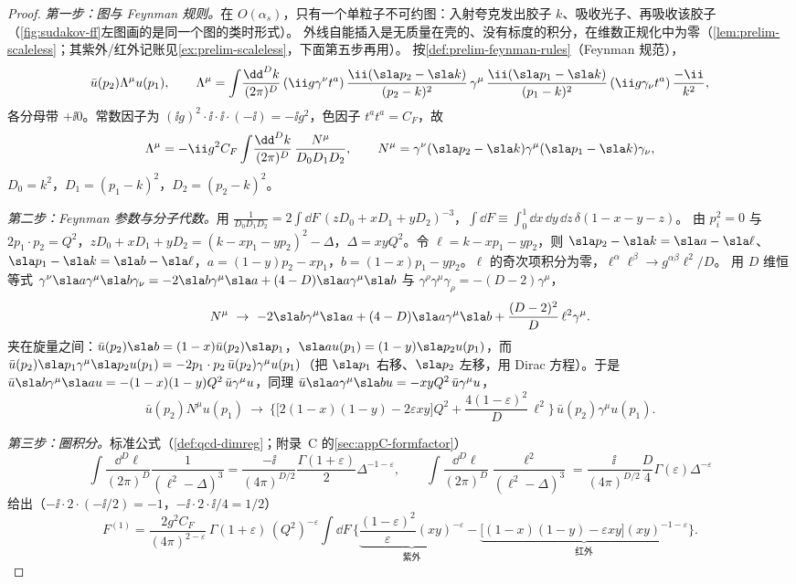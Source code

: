 \begin{proof}
\emph{第一步：图与 Feynman 规则。}在 $O(\alpha_s)$，只有一个单粒子不可约图：入射夸克发出胶子 $k$、吸收光子、再吸收该胶子（\cref{fig:sudakov-ff}左图画的是同一个图的类时形式）。
外线自能插入是无质量在壳的、没有标度的积分，在维数正规化中为零（\cref{lem:prelim-scaleless}；其紫外/红外记账见\cref{ex:prelim-scaleless}，下面第五步再用）。
按\cref{def:prelim-feynman-rules}（Feynman 规范），
\begin{equation}\label{eq:sudakov-vertex}
\bar u(p_2)\Lambda^\mu u(p_1),\qquad
\Lambda^\mu=\int\!\frac{\dd^Dk}{(2\pi)^D}\,(\ii g\gamma^\nu t^a)\,\frac{\ii(\sla p_2-\sla k)}{(p_2-k)^2}\,\gamma^\mu\,\frac{\ii(\sla p_1-\sla k)}{(p_1-k)^2}\,(\ii g\gamma_\nu t^a)\,\frac{-\ii}{k^2},
\end{equation}
各分母带 $+\ii0$。常数因子为 $(\ii g)^2\cdot\ii\cdot\ii\cdot(-\ii)=-\ii g^2$，色因子 $t^at^a=C_F$，故
\[
\Lambda^\mu=-\ii g^2C_F\int\!\frac{\dd^Dk}{(2\pi)^D}\,\frac{N^\mu}{D_0D_1D_2},\qquad N^\mu=\gamma^\nu(\sla p_2-\sla k)\gamma^\mu(\sla p_1-\sla k)\gamma_\nu ,
\]
$D_0=k^2$，$D_1=(p_1-k)^2$，$D_2=(p_2-k)^2$。

\emph{第二步：Feynman 参数与分子代数。}用 $\frac1{D_0D_1D_2}=2\int\!\dd F\,(zD_0+xD_1+yD_2)^{-3}$，$\int\!\dd F\equiv\int_0^1\dd x\,\dd y\,\dd z\,\delta(1-x-y-z)$。
由 $p_i^2=0$ 与 $2p_1\cdot p_2=Q^2$，$zD_0+xD_1+yD_2=(k-xp_1-yp_2)^2-\Delta$，$\Delta=xyQ^2$。令 $\ell=k-xp_1-yp_2$，则
$\sla p_2-\sla k=\sla a-\sla\ell$、$\sla p_1-\sla k=\sla b-\sla\ell$，$a=(1-y)p_2-xp_1$，$b=(1-x)p_1-yp_2$。$\ell$ 的奇次项积分为零，$\ell^\alpha\ell^\beta\to g^{\alpha\beta}\ell^2/D$。
用 $D$ 维恒等式 $\gamma^\nu\sla a\gamma^\mu\sla b\gamma_\nu=-2\sla b\gamma^\mu\sla a+(4-D)\sla a\gamma^\mu\sla b$ 与 $\gamma^\rho\gamma^\mu\gamma_\rho=-(D-2)\gamma^\mu$，
\[
N^\mu\ \to\ -2\sla b\gamma^\mu\sla a+(4-D)\sla a\gamma^\mu\sla b+\frac{(D-2)^2}{D}\,\ell^2\gamma^\mu .
\]
夹在旋量之间：$\bar u(p_2)\sla b=(1-x)\bar u(p_2)\sla p_1$，$\sla a u(p_1)=(1-y)\sla p_2u(p_1)$，而
$\bar u(p_2)\sla p_1\gamma^\mu\sla p_2u(p_1)=-2p_1\cdot p_2\,\bar u(p_2)\gamma^\mu u(p_1)$（把 $\sla p_1$ 右移、$\sla p_2$ 左移，用 Dirac 方程）。于是
$\bar u\sla b\gamma^\mu\sla a u=-(1-x)(1-y)Q^2\,\bar u\gamma^\mu u$，同理 $\bar u\sla a\gamma^\mu\sla b u=-xyQ^2\,\bar u\gamma^\mu u$，
\[
\bar u(p_2)N^\mu u(p_1)\ \to\ \Big\{\big[2(1-x)(1-y)-2\varepsilon xy\big]Q^2+\frac{4(1-\varepsilon)^2}{D}\,\ell^2\Big\}\,\bar u(p_2)\gamma^\mu u(p_1).
\]

\emph{第三步：圈积分。}标准公式（\cref{def:qcd-dimreg}；附录~C 的\cref{sec:appC-formfactor}）
\[
\int\!\frac{\dd^D\ell}{(2\pi)^D}\frac{1}{(\ell^2-\Delta)^3}=\frac{-\ii}{(4\pi)^{D/2}}\frac{\Gamma(1+\varepsilon)}{2}\Delta^{-1-\varepsilon},\qquad
\int\!\frac{\dd^D\ell}{(2\pi)^D}\frac{\ell^2}{(\ell^2-\Delta)^3}=\frac{\ii}{(4\pi)^{D/2}}\frac{D}{4}\Gamma(\varepsilon)\Delta^{-\varepsilon}
\]
给出（$-\ii\cdot2\cdot(-\ii/2)=-1$，$-\ii\cdot2\cdot\ii/4=1/2$）
\[
F^{(1)}=\frac{2g^2C_F}{(4\pi)^{2-\varepsilon}}\,\Gamma(1+\varepsilon)\,(Q^2)^{-\varepsilon}\int\!\dd F\,
\Big\{\underbrace{\frac{(1-\varepsilon)^2}{\varepsilon}(xy)^{-\varepsilon}}_{\text{紫外}}-\underbrace{\big[(1-x)(1-y)-\varepsilon xy\big](xy)^{-1-\varepsilon}}_{\text{红外}}\Big\}.
\]


\end{proof}
